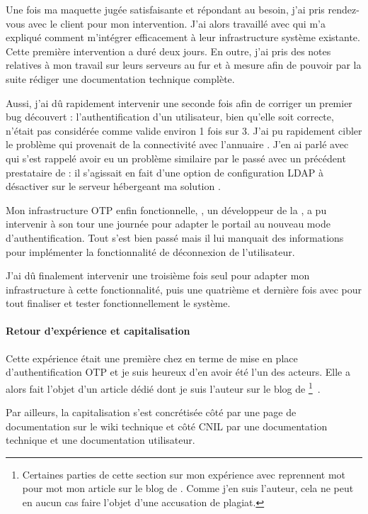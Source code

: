 Une fois ma maquette jugée satisfaisante et répondant au besoin, j'ai pris rendez-vous avec le client pour mon intervention.
J'ai alors travaillé avec \amimiette{} qui m'a expliqué comment m'intégrer efficacement à leur infrastructure système existante.
Cette première intervention a duré deux jours.
En outre, j'ai pris des notes relatives à mon travail sur leurs serveurs au fur et à mesure afin de pouvoir par la suite rédiger une documentation technique complète.

Aussi, j'ai dû rapidement intervenir une seconde fois afin de corriger un premier bug découvert : l'authentification d'un utilisateur, bien qu'elle soit correcte, n'était pas considérée comme valide environ 1 fois sur 3.
J'ai pu rapidement cibler le problème qui provenait de la connectivité avec l'annuaire \aad.
J'en ai parlé avec \amimiette{} qui s'est rappelé avoir eu un problème similaire par le passé avec un précédent prestataire de \asmile : il s'agissait en fait d'une option de configuration LDAP à désactiver sur le serveur hébergeant ma solution \alinotp. 

Mon infrastructure OTP enfin fonctionnelle, \arolel{}, un développeur de la \abugan{}, a pu intervenir à son tour une journée pour adapter le portail \atypo{} au nouveau mode d'authentification.
Tout s'est bien passé mais il lui manquait des informations pour implémenter la fonctionnalité de déconnexion de l'utilisateur.

J'ai dû finalement intervenir une troisième fois seul pour adapter mon infrastructure à cette fonctionnalité, puis une quatrième et dernière fois avec \arolel{} pour tout finaliser et tester fonctionnellement le système.

\paragraph{Retour d'expérience et capitalisation}
Cette expérience était une première chez \asmile{} en terme de mise en place d'authentification OTP et je suis heureux d'en avoir été l'un des acteurs.
Elle a alors fait l'objet d'un article dédié dont je suis l'auteur sur le blog de \asmile{}\footnote{Certaines parties de cette section sur mon expérience avec \alinotp{} reprennent mot pour mot mon article sur le blog de \asmile{}. Comme j'en suis l'auteur, cela ne peut en aucun cas faire l'objet d'une accusation de plagiat.}~\cite{blog}.

Par ailleurs, la capitalisation s'est concrétisée côté \asmile{} par une page de documentation sur le wiki technique et côté CNIL par une documentation technique et une documentation utilisateur.



